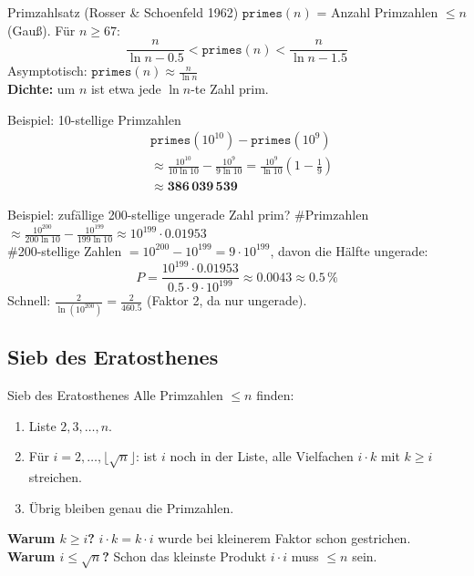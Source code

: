 \documentclass[a4paper, fontsize=7pt]{scrartcl}
\begin{document}
\begin{mainbox}{Primzahlsatz (Rosser \& Schoenfeld 1962)}
$\texttt{primes}(n)$ = Anzahl Primzahlen $\le n$ (Gauß). Für $n \ge 67$:
$$\frac{n}{\ln n - 0.5} < \texttt{primes}(n) < \frac{n}{\ln n - 1.5}$$
Asymptotisch: $\boxed{\texttt{primes}(n) \approx \frac{n}{\ln n}}$\\
\textbf{Dichte:} um $n$ ist etwa jede $\ln n$-te Zahl prim.
\end{mainbox}

\begin{subbox}{Beispiel: 10-stellige Primzahlen}
\begin{align*}
&\texttt{primes}(10^{10}) - \texttt{primes}(10^9)\\
&\approx \frac{10^{10}}{10 \ln 10} - \frac{10^9}{9 \ln 10}
= \frac{10^9}{\ln 10}\left(1 - \frac{1}{9}\right)\\
&\approx \mathbf{386\,039\,539}
\end{align*}
\end{subbox}

\begin{subbox}{Beispiel: zufällige 200-stellige ungerade Zahl prim?}
\#Primzahlen $\approx \frac{10^{200}}{200 \ln 10} - \frac{10^{199}}{199 \ln 10}
\approx 10^{199} \cdot 0.01953$\\
\#200-stellige Zahlen $= 10^{200} - 10^{199} = 9 \cdot 10^{199}$, davon
die Hälfte ungerade:
$$P = \frac{10^{199} \cdot 0.01953}{0.5 \cdot 9 \cdot 10^{199}}
\approx 0.0043 \approx \mathbf{0.5\,\%}$$
Schnell: $\frac{2}{\ln(10^{200})} = \frac{2}{460.5}$ (Faktor 2, da nur ungerade).
\end{subbox}

\subsection{Sieb des Eratosthenes}

\begin{mainbox}{Sieb des Eratosthenes}
Alle Primzahlen $\le n$ finden:
\begin{enumerate}
    \item Liste $2, 3, \ldots, n$.
    \item Für $i = 2, \ldots, \lfloor\sqrt{n}\rfloor$: ist $i$ noch in der
          Liste, alle Vielfachen $i \cdot k$ mit $k \ge i$ streichen.
    \item Übrig bleiben genau die Primzahlen.
\end{enumerate}
\textbf{Warum $k \ge i$?} $i \cdot k = k \cdot i$ wurde bei kleinerem Faktor
schon gestrichen.\\
\textbf{Warum $i \le \sqrt{n}$?} Schon das kleinste Produkt $i \cdot i$ muss
$\le n$ sein.
\end{mainbox}
\end{document}
